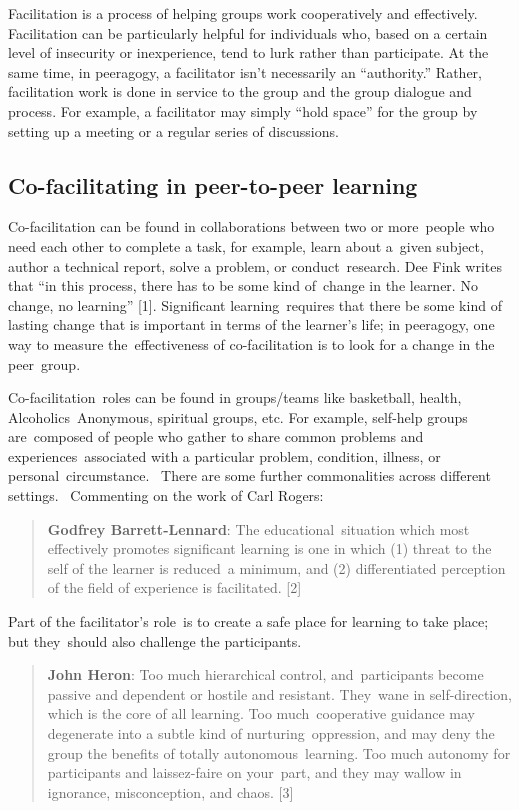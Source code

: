 Facilitation is a process of helping groups work cooperatively and
effectively. Facilitation can be particularly helpful for individuals
who, based on a certain level of insecurity or inexperience, tend to
lurk rather than participate. At the same time, in peeragogy, a
facilitator isn't necessarily an ``authority.'' Rather, facilitation
work is done in service to the group and the group dialogue and process.
For example, a facilitator may simply ``hold space'' for the group by
setting up a meeting or a regular series of discussions.

\subsection{Co-facilitating in peer-to-peer
learning}\label{co-facilitating-in-peer-to-peer-learning}

Co-facilitation can be found in collaborations between two or
more~people who need each other to complete a task, for example, learn
about a~given subject, author a technical report, solve a problem, or
conduct~research. Dee Fink writes that ``in this process, there has to
be some kind of~change in the learner. No change, no learning''
{{[}1{]}}. Significant learning~requires that there be some kind of
lasting change that is important in terms of the learner's life; in
peeragogy, one way to measure the~effectiveness of co-facilitation is to
look for a change in the peer~group.

Co-facilitation~roles can be found in groups/teams like basketball,
health, Alcoholics~Anonymous, spiritual groups, etc. For example,
self-help groups are~composed of people who gather to share common
problems and experiences~associated with a particular problem,
condition, illness, or personal~circumstance.~ There are some further
commonalities across different settings.~ Commenting on the work of Carl
Rogers:

\begin{quote}
\textbf{Godfrey Barrett-Lennard}: The educational~situation which most
effectively promotes significant learning is one in which (1) threat to
the self of the learner is reduced~a minimum, and (2) differentiated
perception of the field of experience is facilitated. {{[}2{]}}
\end{quote}

Part of the facilitator's role~is to create a safe place for learning to
take place; but they~should also challenge the participants.

\begin{quote}
\textbf{John Heron}: Too much hierarchical control, and~participants
become passive and dependent or hostile and resistant. They~wane in
self-direction, which is the core of all learning. Too much~cooperative
guidance may degenerate into a subtle kind of nurturing~oppression, and
may deny the group the benefits of totally autonomous~learning. Too much
autonomy for participants and laissez-faire on your~part, and they may
wallow in ignorance, misconception, and chaos. {{[}3{]}}
\end{quote}

